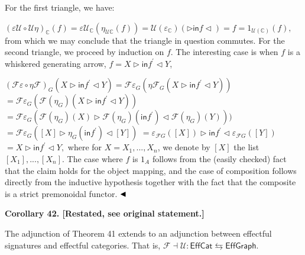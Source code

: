 \documentclass[10pt,a4paper]{article}
\begin{document}
 
For the first triangle, we have:\par
    $\displaystyle(\varepsilon\mathcal{U}\circ\mathcal{U}\eta)_{\mathbb{C}}(f)=\varepsilon\mathcal{U}_{\mathbb{C}}({\eta_{\mathcal{U}\mathbb{C}}}(f))=\mathcal{U}(\varepsilon_{\mathbb{C}})(\triangleright\mathsf{in}f\triangleleft)=f=1_{\mathcal{U}(\mathbb{C})}(f),$    
from which we may conclude that the triangle in question commutes. For the second triangle, we proceed by induction on $f$. The interesting case is when $f$ is a whiskered generating arrow, $f=X\triangleright\mathsf{in}f^{\prime}\triangleleft Y$,\par
    $\displaystyle(\mathcal{F}\varepsilon\circ\eta\mathcal{F})_{G}(X\triangleright\mathsf{in}f^{\prime}\triangleleft Y)={\mathcal{F}\varepsilon_{G}}(\eta\mathcal{F}_{G}(X\triangleright\mathsf{in}f^{\prime}\triangleleft Y))$     $\displaystyle={\mathcal{F}\varepsilon_{G}}(\mathcal{F}(\eta_{G})(X\triangleright\mathsf{in}f^{\prime}\triangleleft Y))$     $\displaystyle={\mathcal{F}\varepsilon_{G}}(\mathcal{F}(\eta_{G})(X)\triangleright\mathcal{F}(\eta_{G})(\mathsf{in}f^{\prime})\triangleleft\mathcal{F}(\eta_{G})(Y)))$     $\displaystyle={\mathcal{F}\varepsilon_{G}}([X]\triangleright\eta_{G}(\mathsf{in}f^{\prime})\triangleleft[Y])$     $\displaystyle={\varepsilon_{\mathcal{F}G}}([X])\triangleright\mathsf{in}f^{\prime}\triangleleft\varepsilon_{\mathcal{F}G}([Y])$     $\displaystyle=X\triangleright\mathsf{in}f^{\prime}\triangleleft Y,$    
where for $X=X_{1},...,X_{n}$, we denote by $[X]$ the list $[X_{1}],...,[X_{n}]$. The case where $f$ is $1_{A}$ follows from the (easily checked) fact that the claim holds for the object mapping, and the case of composition follows directly from the inductive hypothesis together with the fact that the composite is a strict premonoidal functor. $\hfill\blacktriangleleft$\par
 
 
 
 
\par\medskip\noindent\textbf{Corollary 42. [Restated, see original statement.]}\par
 
 
The adjunction of Theorem 41 extends to an adjunction between effectful signatures and effectful categories. That is, $\mathscr{F}\dashv\mathscr{U}:\mathsf{EffCat}\leftrightarrows\mathsf{EffGraph}.$\par
 
\end{document}
